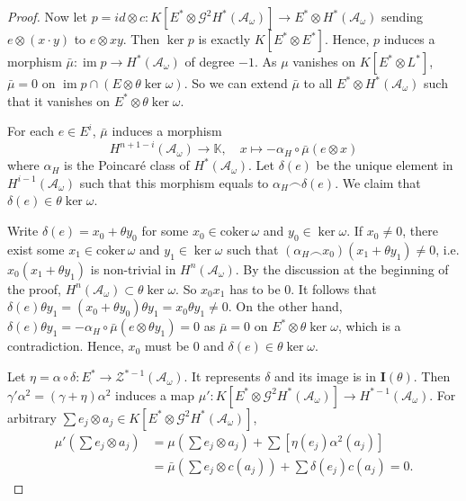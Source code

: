 \documentclass{article}
\theoremstyle{plain}
\theoremstyle{definition}
\theoremstyle{plain}
\DeclareMathOperator{\im}{im}
\numberwithin{equation}{section}
\begin{document}
\begin{proof}
Now let $p=id\otimes c: K[E^*\otimes\mathcal{G}^2H^*(\mathcal{A}_{\omega})]\to E^*\otimes H^*(\mathcal{A}_{\omega})$ sending $e\otimes(x\cdot y)$ to $e\otimes xy$. Then $\ker p$ is exactly $K[E^*\otimes E^*]$. Hence, $p$ induces a morphism $\bar{\mu}:\im p\to H^*(\mathcal{A}_{\omega})$ of degree $-1$. As $\mu$ vanishes on $K[E^*\otimes L^*]$, $\bar{\mu}=0$ on $\im p\cap (E\otimes\theta\ker\omega)$. So we can extend $\bar{\mu}$ to all $E^*\otimes H^*(\mathcal{A}_{\omega})$ such that it vanishes on $E^*\otimes\theta\ker\omega$.

For each $e\in E^i$, $\bar{\mu}$ induces a morphism
$$
H^{n+1-i}(\mathcal{A_{\omega}})\to \mathbb{K}, \quad x\mapsto -\alpha_H\circ\bar{\mu}(e\otimes x)
$$
where $\alpha_H$ is the Poincar\'e class of $H^*(\mathcal{A_{\omega}})$. Let $\delta(e)$ be the unique element in $H^{i-1}(\mathcal{A_{\omega}})$ such that this morphism equals to $\alpha_H\frown\delta(e)$. We claim that $\delta(e)\in\theta\ker\omega$.

Write $\delta(e)=x_0+\theta y_0$ for some $x_0\in\text{coker}\,\omega$ and $y_0\in\ker\omega$. If $x_0\neq 0$, there exist some $x_1\in\text{coker}\,\omega$ and $y_1\in\ker\omega$ such that $(\alpha_H\frown x_0)(x_1+\theta y_1)\neq 0$, i.e. $x_0(x_1+\theta y_1)$ is non-trivial in $H^n(\mathcal{A_{\omega}})$. By the discussion at the beginning of the proof, $H^n(\mathcal{A_{\omega}})\subset \theta\ker\omega$. So $x_0x_1$ has to be 0. It follows that $\delta(e)\theta y_1=(x_0+\theta y_0)\theta y_1=x_0\theta y_1\neq 0$. On the other hand, $\delta(e)\theta y_1=-\alpha_H\circ\bar{\mu}(e\otimes\theta y_1)=0$ as $\bar{\mu}=0$ on $E^*\otimes\theta\ker\omega$, which is a contradiction. Hence, $x_0$ must be 0 and $\delta(e)\in\theta\ker\omega$.

Let $\eta=\alpha\circ\delta:E^*\to \mathcal{Z}^{*-1}(\mathcal{A_{\omega}})$. It represents $\delta$ and its image is in $\mathbf{I}(\theta)$. Then $\gamma'\alpha^2=(\gamma+\eta)\alpha^2$ induces a map $\mu':K[E^*\otimes \mathcal{G}^2H^*(\mathcal{A}_{\omega})]\to H^{*-1}(\mathcal{A}_{\omega})$. For arbitrary $\sum e_j\otimes a_j\in K[E^*\otimes \mathcal{G}^2H^*(\mathcal{A}_{\omega})]$,
\begin{align*}
\mu'\left(\sum e_j\otimes a_j\right) &= \mu\left(\sum e_j\otimes a_j\right)+\sum [\eta(e_j)\alpha^2(a_j)] \\
&= \bar{\mu}\left(\sum e_j\otimes c(a_j)\right)+\sum\delta(e_j)c(a_j) = 0.
\end{align*}


\end{proof}
\end{document}
